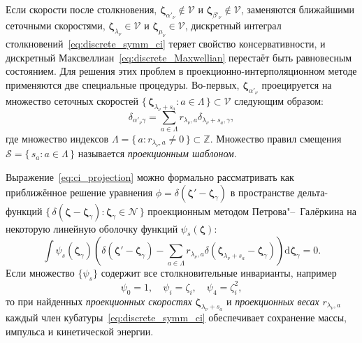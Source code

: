 \documentclass[
aps,%
12pt,%
final,%
notitlepage,%
oneside,%
onecolumn,%
nobibnotes,%
nofootinbib,%
superscriptaddress,%
noshowpacs,%
showkeys,%
floatfix,%
tightenlines,%
centertags]%
{revtex4}
\newcommand{\dd}{\mathrm{d}}
\newcommand{\dzeta}{\boldsymbol{\dd\zeta}}
\newcommand{\bzeta}{\boldsymbol{\zeta}}
\newcommand{\Nu}{\mathcal{N}}
\newcommand{\Set}[2]{\{\,{#1}:{#2}\,\}}
\begin{document}
Если скорости после столкновения,
\(\bzeta_{\alpha'_\nu}\notin\mathcal{V}\) и \(\bzeta_{\beta'_\nu}\notin\mathcal{V}\),
заменяются ближайшими сеточными скоростями,
\(\bzeta_{\lambda_\nu}\in\mathcal{V}\) и \(\bzeta_{\mu_\nu}\in\mathcal{V}\),
дискретный интеграл столкновений~\eqref{eq:discrete_symm_ci} теряет свойство консервативности,
и дискретный Максвеллиан~\eqref{eq:discrete_Maxwellian} перестаёт быть равновесным состоянием.
Для решения этих проблем в проекционно-интерполяционном методе применяются две специальные процедуры.
Во-первых, \(\bzeta_{\alpha'_\nu}\) проецируется на множество сеточных скоростей
\(\Set{\bzeta_{\lambda_\nu+s_a}}{a\in\Lambda}\subset\mathcal{V}\) следующим образом:
\begin{equation}\label{eq:ci_projection}
    \delta_{\alpha'_\nu\gamma} = \sum_{a\in\Lambda} r_{\lambda_\nu,a}\delta_{\lambda_\nu+s_a,\gamma},
\end{equation}
где множество индексов \(\Lambda = \Set{a}{r_{\lambda_\nu,a}\neq0}\subset\mathbb{Z}\).
Множество правил смещения \(\mathcal{S} = \Set{s_a}{a\in\Lambda}\)
называется \emph{проекционным шаблоном}.

Выражение~\eqref{eq:ci_projection} можно формально рассматривать как приближённое решение уравнения
\(\phi=\delta(\bzeta'-\bzeta_\gamma)\) в пространстве дельта-функций
\(\Set{\delta(\bzeta-\bzeta_\gamma)}{\bzeta_\gamma\in\Nu}\)
проекционным методом Петрова"--~Галёркина на некоторую линейную оболочку функций \(\psi_s(\bzeta)\):
\begin{equation}\label{eq:Petrov-Galerkin}
    \int \psi_s(\bzeta_\gamma) \left( \delta(\bzeta'-\bzeta_\gamma)
        - \sum_{a\in\Lambda} r_{\lambda_\nu,a} \delta(\bzeta_{\lambda_\nu+s_a}-\bzeta_\gamma) \right) \dzeta_\gamma = 0.
\end{equation}
Если множество \(\{\psi_s\}\) содержит все столкновительные инварианты, например
\begin{equation}\label{eq:collision_invariants}
    \psi_0 = 1, \quad \psi_i = \zeta_i, \quad \psi_4 = \zeta_i^2,
\end{equation}
то при найденных \emph{проекционных скоростях} \(\bzeta_{\lambda_\nu+s_a}\) и \emph{проекционных весах} \(r_{\lambda_\nu,a}\)
каждый член кубатуры~\eqref{eq:discrete_symm_ci} обеспечивает сохранение массы, импульса и кинетической энергии.
\end{document}
